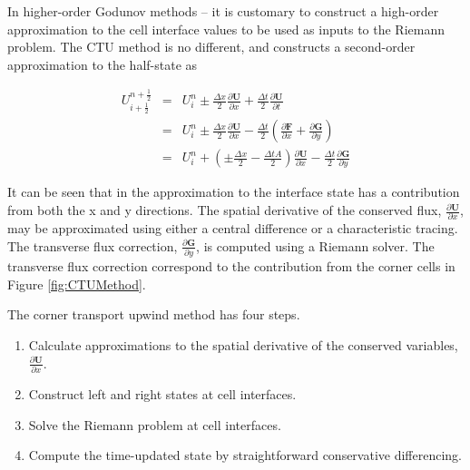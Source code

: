 In higher-order Godunov methods -- it is customary to construct a high-order approximation to the cell interface values to be used as inputs to the Riemann problem.
The CTU method is no different, and constructs a second-order approximation to the half-state as 

\begin{eqnarray}
U_{i+\frac{1}{2}}^{n+\frac{1}{2}} & = &
U_{i}^{n} \pm
\frac{\Delta x}{2} \frac{\partial \mathbf{U}}{\partial x}
+
\frac{\Delta t}{2} \frac{\partial \mathbf{U}}{\partial t} \nonumber\\
&= & 
U_{i}^{n} \pm
\frac{\Delta x}{2} \frac{\partial \mathbf{U}}{\partial x}
-
\frac{\Delta t}{2}
\left(
 \frac{\partial \mathbf{F}}{\partial x}
+ \frac{\partial \mathbf{G}}{\partial y}
\right) \\
&=&
U_{i}^{n} +
\left(
\pm
\frac{\Delta x}{2}
-
\frac{\Delta t A}{2}
\right)
\frac{\partial \mathbf{U}}{\partial x}
-
\frac{\Delta t}{2}
 \frac{\partial \mathbf{G}}{\partial y}
\nonumber
\end{eqnarray}

It can be seen that in the approximation to the interface state has a contribution from both the x and y directions.
The spatial derivative of the conserved flux, 
$ \frac{\partial \mathbf{U}}{\partial x}$,
may be approximated using either a central difference or a characteristic tracing.
The transverse flux correction,
$ \frac{\partial \mathbf{G}}{\partial y}$,
is computed using a Riemann solver.
The transverse flux correction correspond to the contribution from the corner cells in Figure \ref{fig:CTUMethod}.


The corner transport upwind method has four steps.

\begin{enumerate}
\item Calculate approximations to the spatial derivative of the conserved variables,  $ \frac{\partial \mathbf{U} } {\partial x}$.
\item Construct left and right states at cell interfaces.
\item Solve the Riemann problem at cell interfaces.
\item Compute the time-updated state by straightforward conservative differencing.
\end{enumerate}



